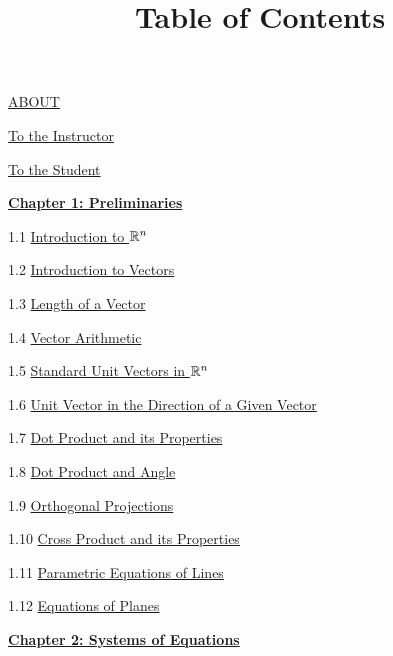 \documentclass{ximera}
\title{Table of Contents} \license{CC BY-NC-SA 4.0}
\begin{document}
\begin{abstract}
\end{abstract}
\maketitle
	
\href{https://ximera.osu.edu/oerlinalg/LinearAlgebra/ABOUT/main}{ABOUT}
	
\href{https://ximera.osu.edu/oerlinalg/LinearAlgebra/ABOUT/main}{To the Instructor}
	
\href{https://ximera.osu.edu/oerlinalg/LinearAlgebra/ABOUT/main}{To the Student}
	
\href{https://ximera.osu.edu/oerlinalg/LinearAlgebra/XLAChapter_prelim/main}{\textbf{Chapter 1: Preliminaries}}
	
1.1	\href{https://ximera.osu.edu/oerlinalg/LinearAlgebra/RRN-0010/main}{Introduction to $\mathbb{R}^n$}
	
1.2	\href{https://ximera.osu.edu/oerlinalg/LinearAlgebra/VEC-0010/main}{Introduction to Vectors}
	
1.3	\href{https://ximera.osu.edu/oerlinalg/LinearAlgebra/VEC-0020/main}{Length of a Vector}
	
1.4	\href{https://ximera.osu.edu/oerlinalg/LinearAlgebra/VEC-0030/main}{Vector Arithmetic}
	
1.5	\href{https://ximera.osu.edu/oerlinalg/LinearAlgebra/VEC-0035/main}{Standard Unit Vectors in $\mathbb{R}^n$}
	
1.6	\href{https://ximera.osu.edu/oerlinalg/LinearAlgebra/VEC-0036/main}{Unit Vector in the Direction of a Given Vector}
	
1.7	\href{https://ximera.osu.edu/oerlinalg/LinearAlgebra/VEC-0050/main}{Dot Product and its Properties}
	
1.8	\href{https://ximera.osu.edu/oerlinalg/LinearAlgebra/VEC-0060/main}{Dot Product and Angle }
	
1.9	\href{https://ximera.osu.edu/oerlinalg/LinearAlgebra/VEC-0070/main}{Orthogonal Projections}
	
1.10	\href{https://ximera.osu.edu/oerlinalg/LinearAlgebra/VEC-0080/main}{Cross Product and its Properties}
	
1.11	\href{https://ximera.osu.edu/oerlinalg/LinearAlgebra/RRN-0020/main}{Parametric Equations of Lines}
	
1.12	\href{https://ximera.osu.edu/oerlinalg/LinearAlgebra/RRN-0030/main}{Equations of Planes}
	
\href{https://ximera.osu.edu/oerlinalg/LinearAlgebra/XLAChapter_systems/main}{\textbf{Chapter 2: Systems of Equations}}
	
\end{document}
